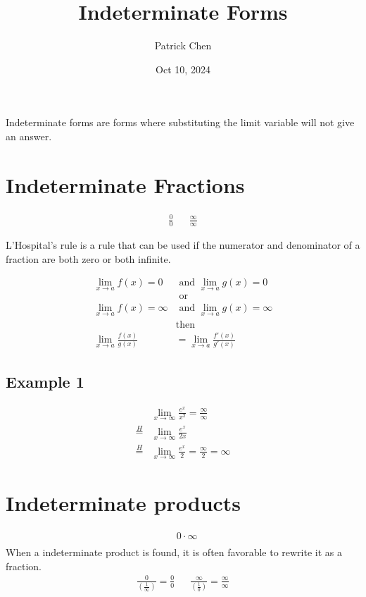 \documentclass{article}
\title{Indeterminate Forms}
\author{Patrick Chen}
\date{Oct 10, 2024}
\theoremstyle{mytheoremstyle}
\theoremstyle{mytheoremstyle}
\theoremstyle{myproblemstyle}
\newcommand\lH{\stackrel{H}{=}}
\begin{document}
    \maketitle
    Indeterminate forms are forms where substituting the limit variable will not
    give an answer.
    
    \section*{Indeterminate Fractions}
    \begin{align*}
        \frac{0}{0} &&
        \frac{\infty}{\infty}
    \end{align*}

    L'Hospital's rule is a rule that can be used if the numerator and
    denominator of a fraction are both zero or both infinite.

    \begin{align*}
        \lim_{x\to a} f(x)=0 &\text{ and } \lim_{x\to a} g(x)=0 \\
        &\text{  or} \\
        \lim_{x\to a} f(x)=\infty &\text{ and } \lim_{x\to a} g(x)=\infty \\
                                  &\text{then} \\
        \lim_{x\to a} \frac{f(x)}{g(x)} &= \lim_{x\to a} \frac{f'(x)}{g'(x)}
    \end{align*}

    \subsection*{Example 1}
    \begin{align*}
        &\lim_{x\to \infty} \frac{e^x}{x^2} = \frac{\infty}{\infty} \\
        \lH&\lim_{x\to \infty} \frac{e^x}{2x} \\
        \lH&\lim_{x\to \infty} \frac{e^x}{2} = \frac{\infty}{2} = \infty
    \end{align*}

    \section*{Indeterminate products}
    \begin{align*}
        & 0\cdot \infty \\
    \end{align*}
    When a indeterminate product is found, it is often favorable to rewrite it
    as a fraction.
    \begin{align*}
        \frac{0}{(\frac{1}{\infty})}=\frac{0}{0}
        && \frac{\infty}{(\frac{1}{0})} = \frac{\infty}{\infty}
    \end{align*}
\end{document}
